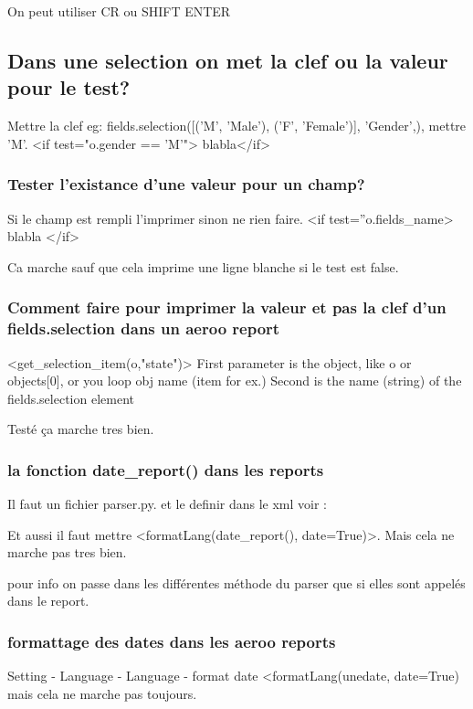 \documentclass[12pt,a4paper]{article}
\begin{document}
On peut utiliser CR ou SHIFT ENTER

\subsection{Dans une selection on met la clef ou la valeur pour le test?}
\label{sec:key_value}

Mettre la clef eg: fields.selection([('M', 'Male'), ('F', 'Female')], 'Gender',),
mettre 'M'. 
<if test="o.gender == 'M'"> blabla</if>

\subsubsection{Tester l'existance d'une valeur pour un champ?}
\label{sec:exist}

Si le champ est rempli l'imprimer sinon ne rien faire.
<if test=''o.fields\_name> blabla </if>

Ca marche sauf que cela imprime une ligne blanche si le test est false.

\subsubsection{Comment faire pour imprimer la valeur et pas la clef d'un fields.selection dans un aeroo report}
\label{sec:value_selection_aeroo}

<get\_selection\_item(o,"state")>
First parameter is the object, like o or objects[0], or you loop obj name (item for ex.)
Second is the name (string) of the fields.selection element

Testé ça marche tres bien.

\subsubsection{la fonction date\_report() dans les reports}
\label{sec:date_report}

Il faut un fichier parser.py. 
et le definir dans le xml voir :

Et aussi il faut mettre <formatLang(date\_report(), date=True)>. Mais cela ne marche pas tres bien.

pour info on passe dans les différentes méthode du parser que si elles sont appelés dans le report. 

\subsubsection{formattage des dates dans les aeroo reports}
\label{sec:format_date_aeroo}
Setting - Language - 
Language - format date 
<formatLang(unedate, date=True) mais cela ne marche pas toujours. 
\end{document}
